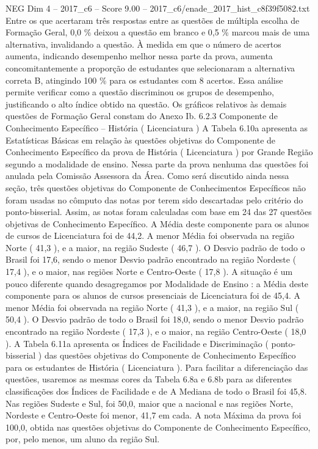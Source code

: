 \begin{textsample}{NEG Dim 4 – 2017\_c6 – Score 9.00 – 2017\_c6/enade\_2017\_hist\_c8f39f5082.txt}
Entre os que acertaram três respostas entre as questões de múltipla escolha de Formação Geral, 0,0 \% deixou a questão em branco e 0,5 \% marcou mais de uma alternativa, invalidando a questão.
À medida em que o número de acertos aumenta, indicando desempenho melhor nessa parte da prova, aumenta concomitantemente a proporção de estudantes que selecionaram a alternativa correta B, atingindo 100 \% para os estudantes com 8 acertos.
Essa análise permite verificar como a questão discriminou os grupos de desempenho, justificando o alto índice obtido na questão.
Os gráficos relativos às demais questões de Formação Geral constam do Anexo Ib. 6.2.3 Componente de Conhecimento Específico – História ( Licenciatura ) A Tabela 6.10a apresenta as Estatísticas Básicas em relação às questões objetivas do Componente de Conhecimento Específico da prova de História ( Licenciatura ) por Grande Região segundo a modalidade de ensino.
Nessa parte da prova nenhuma das questões foi anulada pela Comissão Assessora da Área.
Como será discutido ainda nessa seção, três questões objetivas do Componente de Conhecimentos Específicos não foram usadas no cômputo das notas por terem sido descartadas pelo critério do ponto-bisserial.
Assim, as notas foram calculadas com base em 24 das 27 questões objetivas de Conhecimento Específico.
A Média deste componente para os alunos de cursos de Licenciatura foi de 44,2.
A menor Média foi observada na região Norte ( 41,3 ), e a maior, na região Sudeste ( 46,7 ).
O Desvio padrão de todo o Brasil foi 17,6, sendo o menor Desvio padrão encontrado na região Nordeste ( 17,4 ), e o maior, nas regiões Norte e Centro-Oeste ( 17,8 ).
A situação é um pouco diferente quando desagregamos por Modalidade de Ensino : a Média deste componente para os alunos de cursos presenciais de Licenciatura foi de 45,4.
A menor Média foi observada na região Norte ( 41,3 ), e a maior, na região Sul ( 50,4 ).
O Desvio padrão de todo o Brasil foi 18,0, sendo o menor Desvio padrão encontrado na região Nordeste ( 17,3 ), e o maior, na região Centro-Oeste ( 18,0 ).
A Tabela 6.11a apresenta os Índices de Facilidade e Discriminação ( ponto-bisserial ) das questões objetivas do Componente de Conhecimento Específico para os estudantes de História ( Licenciatura ).
Para facilitar a diferenciação das questões, usaremos as mesmas cores da Tabela 6.8a e 6.8b para as diferentes classificações dos Índices de Facilidade e de A Mediana de todo o Brasil foi 45,8.
Nas regiões Sudeste e Sul, foi 50,0, maior que a nacional e nas regiões Norte, Nordeste e Centro-Oeste foi menor, 41,7 em cada.
A nota Máxima da prova foi 100,0, obtida nas questões objetivas do Componente de Conhecimento Específico, por, pelo menos, um aluno da região Sul.

\end{textsample}
